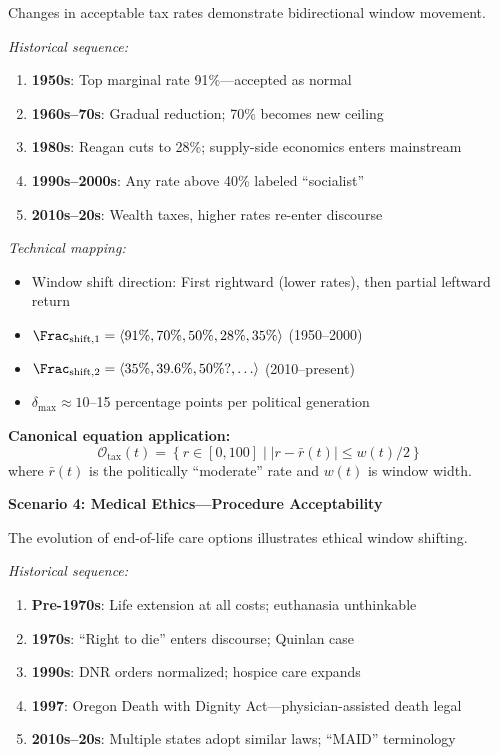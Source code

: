 \begin{tcolorbox}[colback=yellow!5!white,colframe=yellow!65!black,title=\textbf{Real-Life Scenarios: Overton Window Shifts},breakable]
Changes in acceptable tax rates demonstrate bidirectional window movement.

\textit{Historical sequence:}
\begin{enumerate}
    \item \textbf{1950s}: Top marginal rate 91\%---accepted as normal
    \item \textbf{1960s--70s}: Gradual reduction; 70\% becomes new ceiling
    \item \textbf{1980s}: Reagan cuts to 28\%; supply-side economics enters mainstream
    \item \textbf{1990s--2000s}: Any rate above 40\% labeled ``socialist''
    \item \textbf{2010s--20s}: Wealth taxes, higher rates re-enter discourse
\end{enumerate}

\textit{Technical mapping:}
\begin{itemize}
    \item Window shift direction: First rightward (lower rates), then partial leftward return
    \item $\Frac_{\mathrm{shift,1}} = \langle 91\%, 70\%, 50\%, 28\%, 35\% \rangle$ (1950--2000)
    \item $\Frac_{\mathrm{shift,2}} = \langle 35\%, 39.6\%, 50\%?, \ldots \rangle$ (2010--present)
    \item $\delta_{\max} \approx 10$--15 percentage points per political generation
\end{itemize}

\textbf{Canonical equation application:}
\[
    \mathcal{O}_{\mathrm{tax}}(t) = \left\{ r \in [0, 100] \;\Big|\;
    |r - \bar{r}(t)| \leq w(t)/2 \right\}
\]
where $\bar{r}(t)$ is the politically ``moderate'' rate and $w(t)$ is window width.

\hrulefill

\textbf{Scenario 4: Medical Ethics---Procedure Acceptability}

The evolution of end-of-life care options illustrates ethical window shifting.

\textit{Historical sequence:}
\begin{enumerate}
    \item \textbf{Pre-1970s}: Life extension at all costs; euthanasia unthinkable
    \item \textbf{1970s}: ``Right to die'' enters discourse; Quinlan case
    \item \textbf{1990s}: DNR orders normalized; hospice care expands
    \item \textbf{1997}: Oregon Death with Dignity Act---physician-assisted death legal
    \item \textbf{2010s--20s}: Multiple states adopt similar laws; ``MAID'' terminology
\end{enumerate}


\end{tcolorbox}
